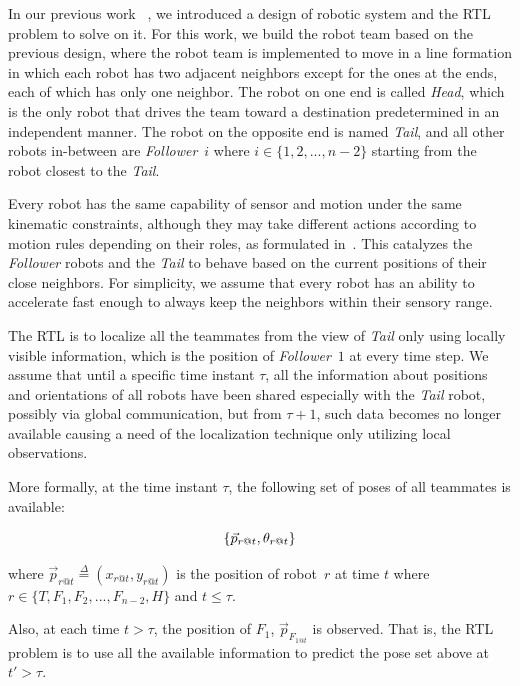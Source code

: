 \documentclass[letterpaper, 10 pt, conference]{ieeeconf}  %
\begin{document}
	In our previous work~\cite{CPR17} , we introduced a design of robotic system and the RTL
	problem to solve on it.
	For this work, we build the robot team based on the previous design, where
	the robot team is implemented to move in a line formation
	in which each robot has two adjacent neighbors except for the ones at the ends,
	each of which has only one neighbor.
	The robot on one end is called \emph{Head}, which is the only robot that
	drives the team toward a destination predetermined in an independent manner.
	The robot on the opposite end is named \emph{Tail}, and all other robots
	in-between are \emph{Follower}~$i$ where $i \in \{1, 2, ..., n-2\}$ starting
	from the robot closest to the \emph{Tail}.

	Every robot has the same capability of sensor and motion under the same
	kinematic constraints, although they may take different actions according to
	motion rules depending on their roles, as formulated in~\cite{CPR17}. This catalyzes the
	 \emph{Follower} robots and the \emph{Tail} to behave based on the current positions of their close neighbors. For simplicity, we assume that every robot
	 has an ability to accelerate fast enough to always keep the neighbors within their
	 sensory range.

	The RTL is to localize all the teammates from the view of
	\emph{Tail} only using locally visible information, which is the position of
	\emph{Follower}~$1$ at every time step.
	We assume that until a specific time instant
	$\tau$, all the information about positions and orientations of all robots
	have been shared especially with the \emph{Tail} robot,
	possibly via global communication,
	but from $\tau+1$, such data becomes no longer available causing a need of the
	localization technique only utilizing local observations.

	More formally, at the time instant $\tau$, the following set of poses of all teammates is
	available:

	\begin{equation*}
		\{\vec{p}_{r@t},\theta_{r@t}\} \\
	\label{eq:pose_set}
	\end{equation*}

	where $\vec{p}_{r@t} \overset{\Delta}{=}(x_{r@t}, y_{r@t})$ is the position of robot~$r$
	at time $t$
	where  $r \in \{T, F_{1}, F_{2}, ..., F_{n-2}, H\}$ and $t \leq \tau$.

	Also, at each time $t > \tau$, the position of $F_1$, $\vec{p}_{F_{1@t}}$ is observed.
	That is, the RTL problem is to use all the available information to predict
	the pose set above at $t' > \tau$.
\end{document}
